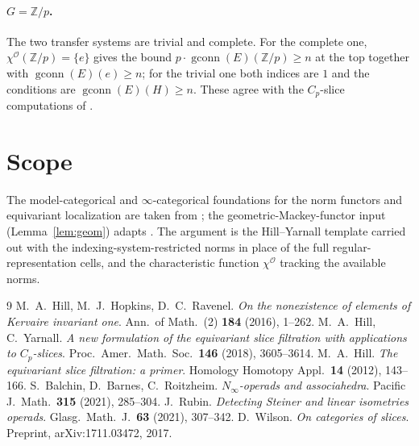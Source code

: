 \documentclass[11pt]{article}
\newcommand{\aO}{\mathcal{O}}
\newcommand{\Z}{\mathbb{Z}}
\newcommand{\gconn}{\operatorname{gconn}}
\theoremstyle{definition}
\begin{document}
\paragraph{$G=\Z/p$.} The two transfer systems are trivial and complete. For the
complete one, $\chi^\aO(\Z/p)=\{e\}$ gives the bound $p\cdot\gconn(E)(\Z/p)\ge n$
at the top together with $\gconn(E)(e)\ge n$; for the trivial one both indices
are $1$ and the conditions are $\gconn(E)(H)\ge n$. These agree with the
$C_p$-slice computations of \cite{HY18}.

\section*{Scope}

The model-categorical and $\infty$-categorical foundations for the
norm functors and equivariant localization are taken from \cite{HHR16, BBR,
Rubin}; the geometric-Mackey-functor input (Lemma~\ref{lem:geom}) adapts
\cite[\S6]{HillPrimer}. The argument is the Hill--Yarnall template
\cite{HY18} carried out with the indexing-system-restricted norms in place of
the full regular-representation cells, and the characteristic function
$\chi^\aO$ tracking the available norms.

\begin{thebibliography}{9}
 M.~A.~Hill, M.~J.~Hopkins, D.~C.~Ravenel.
  \emph{On the nonexistence of elements of Kervaire invariant one}.
  Ann.\ of Math.\ (2) \textbf{184} (2016), 1--262.
 M.~A.~Hill, C.~Yarnall.
  \emph{A new formulation of the equivariant slice filtration with applications
  to $C_p$-slices}. Proc.\ Amer.\ Math.\ Soc.\ \textbf{146} (2018), 3605--3614.
 M.~A.~Hill.
  \emph{The equivariant slice filtration: a primer}.
  Homology Homotopy Appl.\ \textbf{14} (2012), 143--166.
 S.~Balchin, D.~Barnes, C.~Roitzheim.
  \emph{$N_\infty$-operads and associahedra}.
  Pacific J.\ Math.\ \textbf{315} (2021), 285--304.
 J.~Rubin.
  \emph{Detecting Steiner and linear isometries operads}.
  Glasg.\ Math.\ J.\ \textbf{63} (2021), 307--342.
 D.~Wilson.
  \emph{On categories of slices}. Preprint, arXiv:1711.03472, 2017.
\end{thebibliography}
\end{document}
